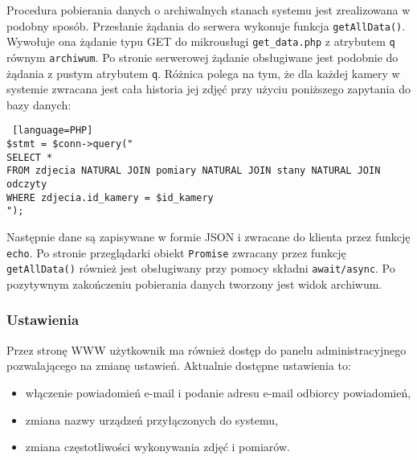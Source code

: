 \documentclass[a4paper,11pt,twoside]{article}
\begin{document}
Procedura pobierania danych o archiwalnych stanach systemu jest zrealizowana w podobny sposób. Przesłanie żądania do serwera wykonuje funkcja \texttt{getAllData()}. Wywołuje ona żądanie typu GET do mikrousługi \texttt{get{\_}data.php} z atrybutem \texttt{q} równym \texttt{archiwum}. Po stronie serwerowej żądanie obsługiwane jest podobnie do żądania z pustym atrybutem \texttt{q}. Różnica polega na tym, że dla każdej kamery w systemie zwracana jest cała historia jej zdjęć przy użyciu poniższego zapytania do bazy danych:
\begin{lstlisting} [language=PHP]
$stmt = $conn->query("
SELECT *
FROM zdjecia NATURAL JOIN pomiary NATURAL JOIN stany NATURAL JOIN odczyty
WHERE zdjecia.id_kamery = $id_kamery
");
\end{lstlisting}
Następnie dane są zapisywane w formie JSON i zwracane do klienta przez funkcję \texttt{echo}. Po stronie przeglądarki obiekt \texttt{Promise} zwracany przez funkcję \texttt{getAllData()} również jest obsługiwany przy pomocy składni \texttt{await/async}. Po pozytywnym zakończeniu pobierania danych tworzony jest widok archiwum.

\subsubsection{Ustawienia}
Przez stronę WWW użytkownik ma również dostęp do panelu administracyjnego pozwalającego na zmianę ustawień. Aktualnie dostępne ustawienia to:
\begin{itemize}
\item włączenie powiadomień e-mail i podanie adresu e-mail odbiorcy powiadomień,
\item zmiana nazwy urządzeń przyłączonych do systemu,
\item zmiana częstotliwości wykonywania zdjęć i pomiarów.
\end{itemize}
\end{document}
